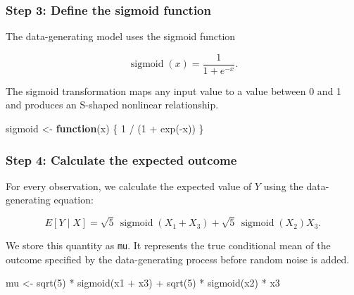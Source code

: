 \documentclass[
  letterpaper,
  DIV=11,
  numbers=noendperiod]{scrreprt}
\newenvironment{Shaded}{\begin{snugshade}}{\end{snugshade}}
\newcommand{\ControlFlowTok}[1]{\textcolor[rgb]{0.00,0.23,0.31}{\textbf{#1}}}
\newcommand{\DecValTok}[1]{\textcolor[rgb]{0.68,0.00,0.00}{#1}}
\newcommand{\FunctionTok}[1]{\textcolor[rgb]{0.28,0.35,0.67}{#1}}
\newcommand{\NormalTok}[1]{\textcolor[rgb]{0.00,0.23,0.31}{#1}}
\newcommand{\OtherTok}[1]{\textcolor[rgb]{0.00,0.23,0.31}{#1}}
\newcommand{\SpecialCharTok}[1]{\textcolor[rgb]{0.37,0.37,0.37}{#1}}
\begin{document}
\subsubsection{Step 3: Define the sigmoid
function}\label{step-3-define-the-sigmoid-function}

The data-generating model uses the sigmoid function

\[
\operatorname{sigmoid}(x)
=
\frac{1}{1+e^{-x}}.
\]

The sigmoid transformation maps any input value to a value between 0 and
1 and produces an S-shaped nonlinear relationship.

\begin{Shaded}
\begin{Highlighting}[]
\NormalTok{sigmoid }\OtherTok{\textless{}{-}} \ControlFlowTok{function}\NormalTok{(x) \{}
  \DecValTok{1} \SpecialCharTok{/}\NormalTok{ (}\DecValTok{1} \SpecialCharTok{+} \FunctionTok{exp}\NormalTok{(}\SpecialCharTok{{-}}\NormalTok{x))}
\NormalTok{\}}
\end{Highlighting}
\end{Shaded}

\subsubsection{Step 4: Calculate the expected
outcome}\label{step-4-calculate-the-expected-outcome}

For every observation, we calculate the expected value of \(Y\) using
the data-generating equation:

\[
E[Y \mid X]
=
\sqrt{5}\,\operatorname{sigmoid}(X_1 + X_3)
+
\sqrt{5}\,\operatorname{sigmoid}(X_2)X_3.
\]

We store this quantity as \texttt{mu}. It represents the true
conditional mean of the outcome specified by the data-generating process
before random noise is added.

\begin{Shaded}
\begin{Highlighting}[]
\NormalTok{mu }\OtherTok{\textless{}{-}} \FunctionTok{sqrt}\NormalTok{(}\DecValTok{5}\NormalTok{) }\SpecialCharTok{*} \FunctionTok{sigmoid}\NormalTok{(x1 }\SpecialCharTok{+}\NormalTok{ x3) }\SpecialCharTok{+}
      \FunctionTok{sqrt}\NormalTok{(}\DecValTok{5}\NormalTok{) }\SpecialCharTok{*} \FunctionTok{sigmoid}\NormalTok{(x2) }\SpecialCharTok{*}\NormalTok{ x3}
\end{Highlighting}
\end{Shaded}
\end{document}
